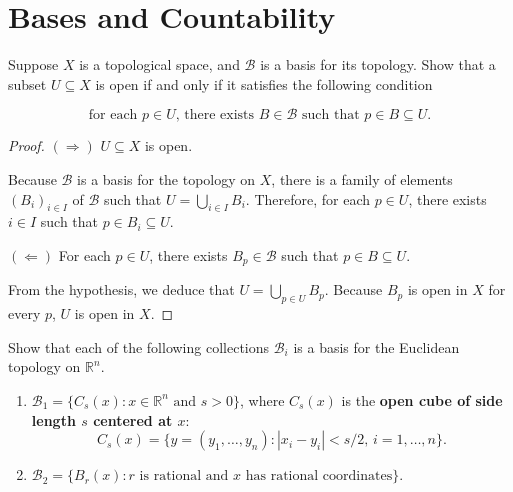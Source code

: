 \section*{Bases and Countability}

\begin{exercise}{2.40}
	Suppose $X$ is a topological space, and $\mathscr{B}$ is a basis for its topology. Show that a subset $U\subseteq X$ is open if and only if it satisfies the following condition

	\begin{equation*}
		\text{for each $p\in U$, there exists $B\in\mathscr{B}$ such that $p\in B\subseteq U$.}
	\end{equation*}
\end{exercise}

\begin{proof}
	$(\Rightarrow)$ $U\subseteq X$ is open.

	Because $\mathscr{B}$ is a basis for the topology on $X$, there is a family of elements ${(B_{i})}_{i\in I}$ of $\mathscr{B}$ such that $U = \bigcup_{i\in I} B_{i}$. Therefore, for each $p\in U$, there exists $i\in I$ such that $p\in B_{i}\subseteq U$.

	$(\Leftarrow)$ For each $p\in U$, there exists $B_{p}\in\mathscr{B}$ such that $p\in B\subseteq U$.

	From the hypothesis, we deduce that $U = \bigcup_{p\in U}B_{p}$. Because $B_{p}$ is open in $X$ for every $p$, $U$ is open in $X$.
\end{proof}

\begin{exercise}{2.42}
	Show that each of the following collections $\mathscr{B}_{i}$ is a basis for the Euclidean topology on $\mathbb{R}^{n}$.
	\begin{enumerate}[label={(\alph*)}]
		\item $\mathscr{B}_{1} = \{ C_{s}(x): x\in\mathbb{R}^{n} \text{ and } s > 0 \}$, where $C_{s}(x)$ is the \textbf{open cube of side length $s$ centered at $x$}:
		      \[
			      C_{s}(x) = \{ y = (y_{1}, \ldots, y_{n}) : \left\vert{x_{i} - y_{i}}\right\vert < s/2,\, i = 1,\ldots,n \}.
		      \]
		\item $\mathscr{B}_{2} = \{ B_{r}(x): \text{$r$ is rational and $x$ has rational coordinates} \}$.
	\end{enumerate}
\end{exercise}

